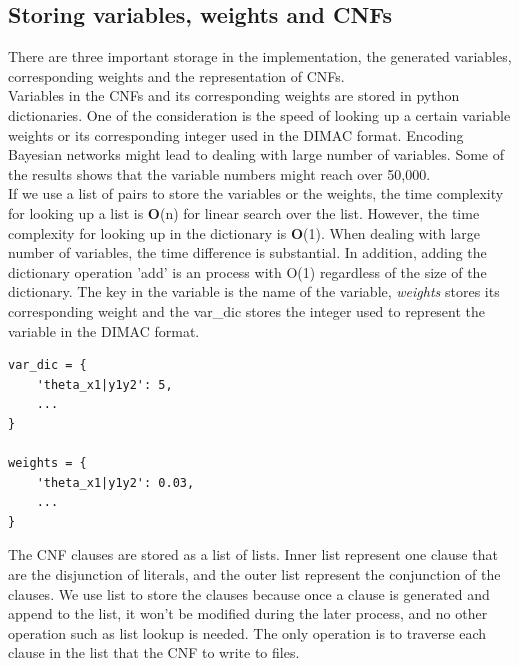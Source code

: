 \subsection{Storing variables, weights and CNFs}
There are three important storage in the implementation, the generated variables, corresponding weights and the representation of CNFs.\\

\noindent Variables in the CNFs and its corresponding weights are stored in python dictionaries. One of the consideration is the speed of looking up  a certain variable weights or its corresponding integer used in the DIMAC format. Encoding Bayesian networks might lead to dealing with large number of variables. Some of the results \cite{2008-literature-review} shows that the variable numbers might reach over 50,000. \\

\noindent If we use a list of pairs to store the variables or the weights, the time complexity for looking up a list is \textbf{O}(n) for linear search over the list. However, the time complexity for looking up in the dictionary is \textbf{O}(1). When dealing with large number of variables, the time difference is substantial. In addition, adding the dictionary operation 'add' is an process with O(1) regardless of the size of the dictionary. The key in the variable is the name of the variable, \textit{weights} stores its corresponding weight and the var\_dic stores the integer used to represent the variable in the DIMAC format.

\begin{lstlisting}
var_dic = {
    'theta_x1|y1y2': 5,
    ...
}

weights = {
    'theta_x1|y1y2': 0.03,
    ...
}
\end{lstlisting}

\noindent The CNF clauses are stored as a list of lists. Inner list represent one clause that are the disjunction of literals, and the outer list represent the conjunction of the clauses. We use list to store the clauses because once a clause is generated and append to the list, it won't be modified during the later process, and no other operation such as list lookup is needed. The only operation is to traverse each clause in the list that the CNF to write to files.
